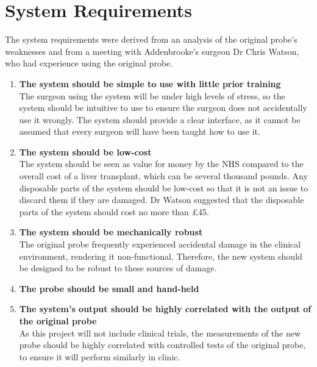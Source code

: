 \section{System Requirements}

The system requirements were derived from an analysis of the original probe's weaknesses and from a meeting with Addenbrooke's surgeon Dr Chris Watson, who had experience using the original probe.


\begin{enumerate}
\item \label{req: simple} \textbf{The system should be simple to use with little prior training}\\
The surgeon using the system will be under high levels of stress, so the system should be intuitive to use to ensure the surgeon does not accidentally use it wrongly. The system should provide a clear interface, as it cannot be assumed that every surgeon will have been taught how to use it.

\item \label{req: cheap} \textbf{The system should be low-cost}\\
The system should be seen as value for money by the NHS compared to the overall cost of a liver transplant, which can be several thousand pounds. Any disposable parts of the system should be low-cost so that it is not an issue to discard them if they are damaged. Dr Watson suggested that the disposable parts of the system should cost no more than £45.

\item \label{req: robust} \textbf{The system should be mechanically robust}\\
The original probe frequently experienced accidental damage in the clinical environment, rendering it non-functional. Therefore, the new system should be designed to be robust to these sources of damage.

\item \label{req: small} \textbf{The probe should be small and hand-held}\\



\item \label{req: correlation} \textbf{The system's output should be highly correlated with the output of the original probe}\\
As this project will not include clinical trials, the measurements of the new probe should be highly correlated with controlled tests of the original probe, to ensure it will perform similarly in clinic.




\end{enumerate}
